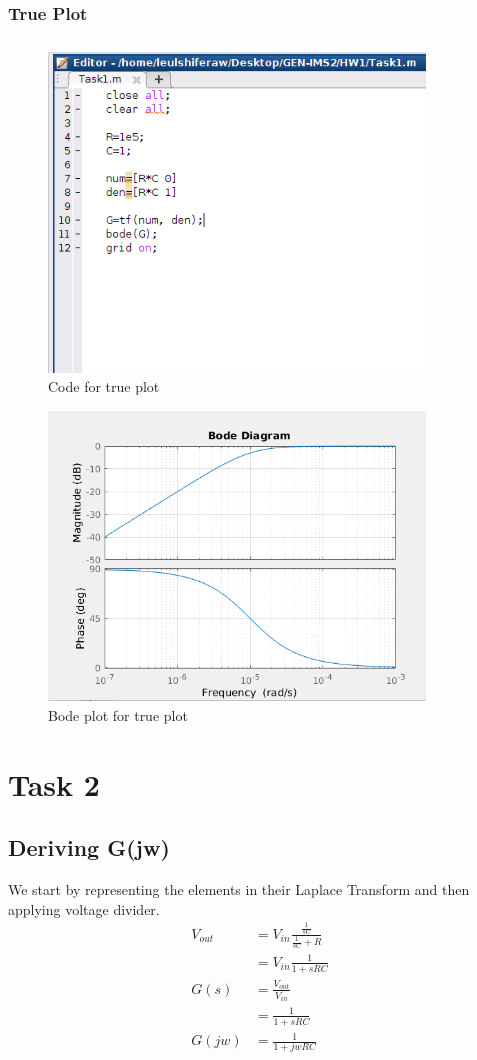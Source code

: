 \documentclass{article}
\begin{document}
			\subsubsection{True Plot}
			\begin{figure}[h!]
				\includegraphics[width=10cm]{Task1_true.png}
				\caption{Code for true plot}
			\end{figure}
			\begin{figure}[h!]
				\includegraphics[width=10cm]{Task1_true_bode.png}
				\caption{Bode plot for true plot}
			\end{figure}
	\section{Task 2}
		\subsection{Deriving G(jw)}
		We start by representing the elements in their Laplace Transform and then applying voltage divider.\\
		\begin{align*}
			V_{out}&=V_{in}\frac{\frac{1}{sC}}{\frac{1}{sC}+R}\\
				&=V_{in}\frac{1}{1+sRC}\\
			G(s)&=\frac{V_{out}}{V_{in}}\\
				&=\frac{1}{1+sRC}\\
			G(jw)&=\frac{1}{1+jwRC}
		\end{align*}
	\newpage
\end{document}
